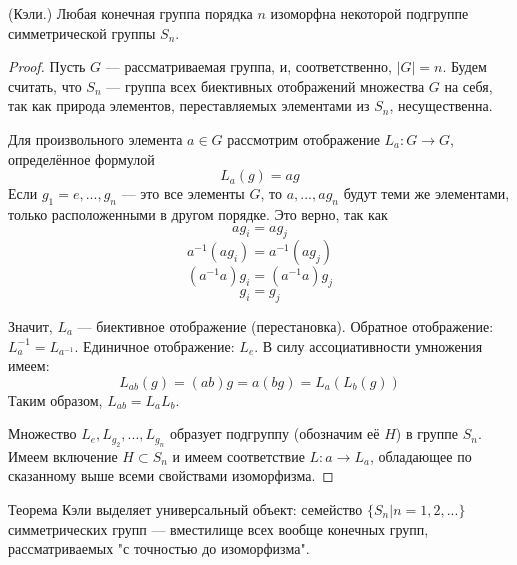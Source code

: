 \begin{theorem}
    (Кэли.) Любая конечная группа порядка $n$ изоморфна некоторой подгруппе симметрической группы $S_n$.
\end{theorem}
\begin{proof}
    Пусть $G$ --- рассматриваемая группа, и, соответственно, $|G|=n$. Будем считать, что $S_n$ --- группа всех биективных отображений множества $G$ на себя, так как природа элементов, переставляемых элементами из $S_n$, несущественна.

    Для произвольного элемента $a\in G$ рассмотрим отображение $L_a:G\to G$, определённое формулой
    \begin{equation*}
        L_a(g)=ag
    \end{equation*}
    Если $g_1=e,...,g_n$ --- это все элементы $G$, то $a,...,ag_n$ будут теми же элементами, только расположенными в другом порядке. Это верно, так как
    \begin{equation*}
        ag_i=ag_j
    \end{equation*}
    \begin{equation*}
        a^{-1}(ag_i)=a^{-1}(ag_j)
    \end{equation*}
    \begin{equation*}
        (a^{-1}a)g_i=(a^{-1}a)g_j
    \end{equation*}
    \begin{equation*}
        g_i=g_j
    \end{equation*}

    Значит, $L_a$ --- биективное отображение (перестановка). Обратное отображение: $L_a^{-1}=L_{a^{-1}}$. Единичное отображение: $L_e$.
    В силу ассоциативности умножения имеем:
    \begin{equation*}
        L_{ab}(g)=(ab)g=a(bg)=L_a(L_b(g))
    \end{equation*}
    Таким образом, $L_{ab}=L_aL_b$.

    Множество $L_e,L_{g_2},...,L_{g_n}$ образует подгруппу (обозначим её $H$) в группе $S_n$. Имеем включение $H \subset S_n$ и имеем соответствие $L:a\to L_a$, обладающее по сказанному выше всеми свойствами изоморфизма.
\end{proof}

\begin{remark}
    Теорема Кэли выделяет универсальный объект: семейство $\{S_n|n=1,2,...\}$ симметрических групп --- вместилище всех вообще конечных групп, рассматриваемых "с точностью до изоморфизма".
\end{remark}

